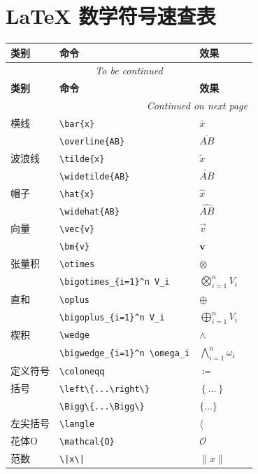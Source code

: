 \section{LaTeX 数学符号速查表}
 
\begin{longtable}{|l|p{4cm}|l|p{6cm}|}
\hline
\textbf{类别} & \textbf{命令} & \textbf{效果} \\
\hline
\endfirsthead
\multicolumn{4}{c}{\textit{To be continued}} \\
\hline
\textbf{类别} & \textbf{命令} & \textbf{效果}  \\
\hline
\endhead
\hline
\multicolumn{4}{r}{\textit{Continued on next page}} \\
\endfoot
\hline
\endlastfoot

横线 & \verb|\bar{x}| & $\bar{x}$ \\
     & \verb|\overline{AB}| & $\overline{AB}$ \\
\hline
波浪线 & \verb|\tilde{x}| & $\tilde{x}$  \\
       & \verb|\widetilde{AB}| & $\widetilde{AB}$  \\
\hline
帽子 & \verb|\hat{x}| & $\hat{x}$ \\
     & \verb|\widehat{AB}| & $\widehat{AB}$ \\
\hline
向量 & \verb|\vec{v}| & $\vec{v}$  \\
     & \verb|\bm{v}| & $\bm{v}$  \\
\hline
张量积 & \verb|\otimes| & $\otimes$ \\
       & \verb|\bigotimes_{i=1}^n V_i| & $\bigotimes_{i=1}^n V_i$ \\
\hline
直和 & \verb|\oplus| & $\oplus$ \\
     & \verb|\bigoplus_{i=1}^n V_i| & $\bigoplus_{i=1}^n V_i$ \\
\hline
楔积 & \verb|\wedge| & $\wedge$ \\
~ & \verb|\bigwedge_{i=1}^n \omega_i| & $\bigwedge_{i=1}^n \omega_i$  \\
\hline
定义符号 & \verb|\coloneqq| & $\coloneqq$ \\
\hline
括号 & \verb|\left\{...\right\}| & $\left\{...\right\}$ \\
     & \verb|\Bigg\{...\Bigg\}| & $\Bigg\{...\Bigg\}$  \\
\hline
左尖括号& \verb|\langle| & $\langle$  \\
\hline
花体O& \verb|\mathcal{O}| & $\mathcal{O}$ \\
\hline
范数 & \texttt{\textbackslash|x\textbackslash|} & $\|x\|$ \\

\end{longtable}

